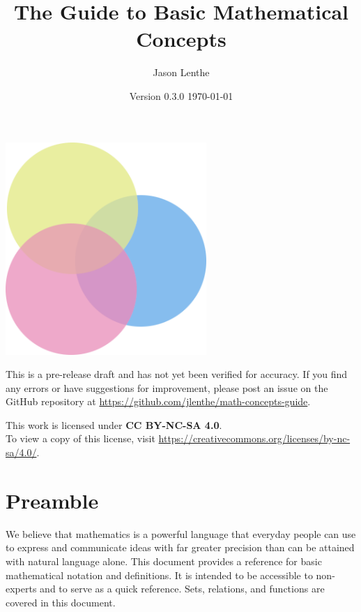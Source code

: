 \documentclass[letterpaper]{article}
\title{\sffamily\textbf{The Guide to Basic Mathematical Concepts}}
\author{\sffamily Jason Lenthe}
\date{Version 0.3.0 \quad \today}
\begin{document}
\maketitle
\vskip 0.5in
\begin{center}
    \includegraphics[width=3in]{images/logo.png}
\end{center}

\vfill
\begin{warning}
  This is a pre-release draft and has not yet been verified for accuracy.
  If you find any errors or have suggestions for improvement, please post
  an issue on the GitHub repository at
  \url{https://github.com/jlenthe/math-concepts-guide}.
\end{warning}
\begin{center}
    {\small This work is licensed under \textbf{CC BY-NC-SA 4.0}.\\
    To view a copy of this license, visit \url{https://creativecommons.org/licenses/by-nc-sa/4.0/}.}
\end{center}

\newpage
\tableofcontents
\newpage

\section*{Preamble}
We believe that mathematics is a powerful language that everyday people can
use to express and communicate ideas with far greater precision than can be
attained with natural language alone. This document provides a reference for
basic mathematical notation and definitions. It is intended to be accessible
to non-experts and to serve as a quick reference. Sets, relations, and
functions are covered in this document.









\end{document}
